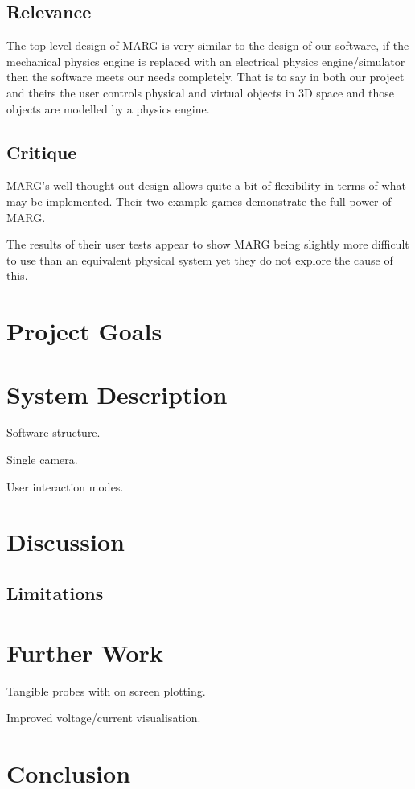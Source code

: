 \subsection{Relevance}
The top level design of MARG is very similar to the design of our software, if the mechanical physics engine is replaced with an electrical physics engine/simulator then the software meets our needs completely. That is to say in both our project and theirs the user controls physical and virtual objects in 3D space and those objects are modelled by a physics engine.

\subsection{Critique}
MARG's well thought out design allows quite a bit of flexibility in terms of what may be implemented. Their two example games demonstrate the full power of MARG.

The results of their user tests appear to show MARG being slightly more difficult to use than an equivalent physical system yet they do not explore the cause of this.


\section{Project Goals}

\section{System Description}
Software structure.

Single camera.

User interaction modes.

\section{Discussion}

\subsection{Limitations}

\section{Further Work}
Tangible probes with on screen plotting.

Improved voltage/current visualisation.

\section{Conclusion}

